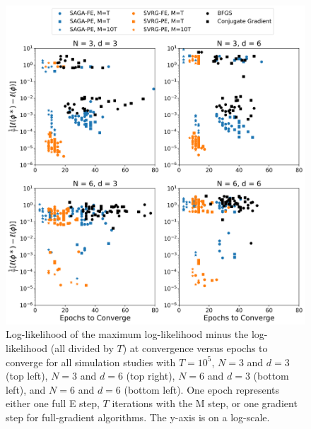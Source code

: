 \begin{figure}
    \centering
    \includegraphics[width=6.5in]{../plt/scatter_sim_T_100000.png}
    \caption{Log-likelihood of the maximum log-likelihood minus the log-likelihood (all divided by $T$) at convergence versus epochs to converge for all simulation studies with $T=10^{5}$, $N=3$ and $d=3$ (top left), $N=3$ and $d=6$ (top right), $N=6$ and $d=3$ (bottom left), and $N=6$ and $d=6$ (bottom left). One epoch represents either one full E step, $T$ iterations with the M step, or one gradient step for full-gradient algorithms. The y-axis is on a log-scale.}
    \label{fig:scatter_sim}
\end{figure}
%




